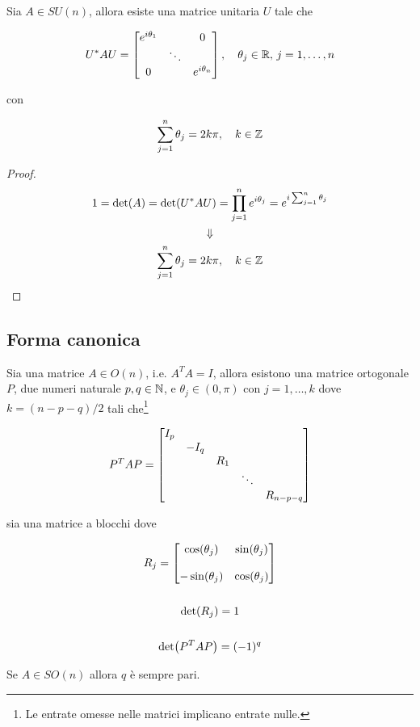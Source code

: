 \begin{corollary}[4]
	Sia $ A \in SU(n) $, allora esiste una matrice unitaria $ U $ tale che
	
	\begin{equation}
		U^{*} A U = %
		\bmqty{ %
				\dmat{ %
						e^{i \theta_{1}} & & 0 \\
						& \ddots & \\
						0 & & e^{i \theta_{n}} %
						}
				} %
		\qcomma \theta_{j} \in \R, \, j=1,\dots,n
	\end{equation}

	con
	
	\begin{equation}
		\sum_{j=1}^{n} \theta_{j} = 2 k \pi \qcomma k \in \Z
	\end{equation}
\end{corollary}

\begin{proof}
	\begin{gather}
		1 = \det(A) = \det(U^{*} A U) = \prod_{j=1}^{n} e^{i \theta_{j}} = e^{i \sum_{j=1}^{n} \theta_{j}} \\
		\Downarrow \\
		\sum_{j=1}^{n} \theta_{j} = 2 k \pi \qcomma k \in \Z
	\end{gather}
\end{proof}

\subsection{Forma canonica}

\begin{theorem}
	Sia una matrice $ A \in O(n) $, i.e. $ A^{T} A = I $, allora esistono una matrice ortogonale $ P $, due numeri naturale $ p,q \in \mathbb{N} $, e $ \theta_{j} \in (0,\pi) $ con $ j=1,\dots,k $ dove $ k = (n-p-q)/2 $ tali che\footnote{%
		Le entrate omesse nelle matrici implicano entrate nulle.%
	}

	\begin{equation}
		P^{T} A P = %
		\bmqty{ %
				\dmat{ %
					I_{p}, - I_{q}, R_{1}, \ddots, R_{n-p-q} %
					}
				}
	\end{equation}

	sia una matrice a blocchi dove
	
	\begin{gather}
		R_{j} = %
		\bmqty{ %
				\cos(\theta_{j}) & \sin(\theta_{j}) \\\\
				- \sin(\theta_{j}) & \cos(\theta_{j}) %
				 } \\
		\nonumber \\
		\det(R_{j}) = 1 \\
		\nonumber \\
		\det(P^{T} A P) = (- 1)^{q}
	\end{gather}

	Se $ A \in SO(n) $ allora $ q $ è sempre pari.
\end{theorem}

